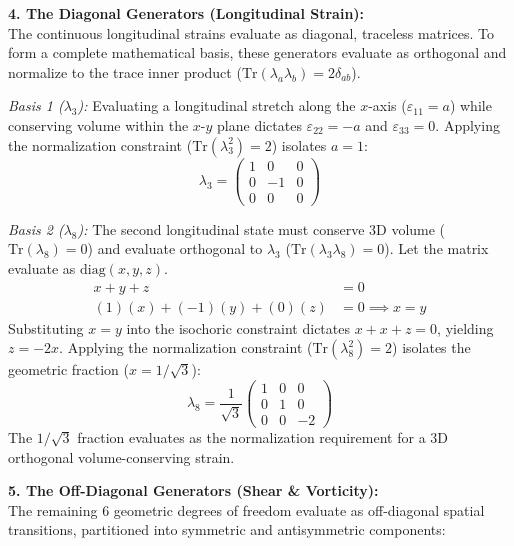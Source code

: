 \textbf{4. The Diagonal Generators (Longitudinal Strain):} \\
The continuous longitudinal strains evaluate as diagonal, traceless matrices. To form a complete mathematical basis, these generators evaluate as orthogonal and normalize to the trace inner product ($\text{Tr}(\lambda_a \lambda_b) = 2\delta_{ab}$).

\textit{Basis 1 ($\lambda_3$):} 
Evaluating a longitudinal stretch along the $x$-axis ($\varepsilon_{11} = a$) while conserving volume within the $x$-$y$ plane dictates $\varepsilon_{22} = -a$ and $\varepsilon_{33} = 0$. Applying the normalization constraint ($\text{Tr}(\lambda_3^2) = 2$) isolates $a = 1$:
\begin{equation}
    \lambda_3 = \begin{pmatrix} 1 & 0 & 0 \\ 0 & -1 & 0 \\ 0 & 0 & 0 \end{pmatrix} 
\end{equation}

\textit{Basis 2 ($\lambda_8$):} 
The second longitudinal state must conserve 3D volume ($\text{Tr}(\lambda_8) = 0$) and evaluate orthogonal to $\lambda_3$ ($\text{Tr}(\lambda_3 \lambda_8) = 0$). Let the matrix evaluate as $\text{diag}(x, y, z)$.
\begin{align}
    x + y + z &= 0 \nonumber \\
    (1)(x) + (-1)(y) + (0)(z) &= 0 \implies x = y \nonumber
\end{align}
Substituting $x = y$ into the isochoric constraint dictates $x + x + z = 0$, yielding $z = -2x$. Applying the normalization constraint ($\text{Tr}(\lambda_8^2) = 2$) isolates the geometric fraction ($x = 1/\sqrt{3}$):
\begin{equation}
    \lambda_8 = \frac{1}{\sqrt{3}} \begin{pmatrix} 1 & 0 & 0 \\ 0 & 1 & 0 \\ 0 & 0 & -2 \end{pmatrix} 
\end{equation}
The $1/\sqrt{3}$ fraction evaluates as the normalization requirement for a 3D orthogonal volume-conserving strain.

\textbf{5. The Off-Diagonal Generators (Shear \& Vorticity):} \\
The remaining $6$ geometric degrees of freedom evaluate as off-diagonal spatial transitions, partitioned into symmetric and antisymmetric components:

